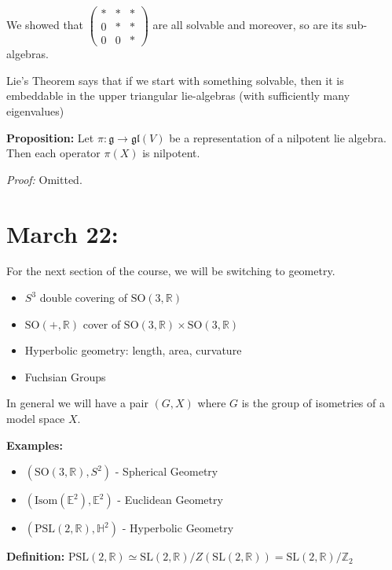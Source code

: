 \documentclass[12pt]{article}
\newcommand{\R}{\mathbb{R}}
\newcommand{\E}{\mathbb{E}}
\newcommand{\Z}{\mathbb{Z}}
\renewcommand{\H}{\mathbb{H}}
\newcommand{\SL}{\text{SL}}
\newcommand{\SO}{\text{SO}}
\newcommand{\g}{\mathfrak{g}}
\newcommand{\gl}{\mathfrak{gl}}
\newcommand{\Isom}{\text{Isom}}
\newcommand{\PSL}{\text{PSL}}
\newenvironment*{tbox}[2][gray]{
    \begin{tcolorbox}[
        parbox=false,
        colback=#1!5!white,
        colframe=#1!75!black,
        breakable,
        title={#2}
    ]}
    {\end{tcolorbox}}
\begin{document}
    We showed that $\begin{pmatrix}
        * & * & *\\ 
        0 & * & *\\ 
        0 & 0 & *
    \end{pmatrix}$ are all solvable and moreover, so are its sub-algebras. 

    Lie's Theorem says that if we start with something solvable, then it is embeddable in the upper triangular lie-algebras (with sufficiently many eigenvalues) 
    
    \textbf{Proposition:} Let $\pi: \g \to \gl(V)$ be a representation of a nilpotent lie algebra. Then each operator $\pi(X)$ is nilpotent. 

    \begin{tbox}{\textbf{Engel's Theorem:} Let $\pi: \g \to \gl(V)$ be a representation such that each $\pi(X)$ is nilpotent (vanishes under powers) for each $X \in \g$. Then $\pi(\g)$ is a nilpotent lie-algebra (lower central series converges).}
        \emph{Proof:} Omitted.
    \end{tbox}

\section{March 22:} 
    For the next section of the course, we will be switching to geometry. 
    \begin{itemize}
        \item $S^3$ double covering of $\SO(3, \R)$
        \item $\SO(+, \R)$ cover of $\SO(3, \R) \times \SO(3, \R)$
        \item Hyperbolic geometry: length, area, curvature 
        \item Fuchsian Groups 
    \end{itemize}

    In general we will have a pair $(G, X)$ where $G$ is the group of isometries of a model space $X$. 

    \textbf{Examples:}
    \begin{itemize}
        \item $(\SO(3, \R), S^2)$ - Spherical Geometry 
        \item $(\Isom(\E^2), \E^2)$ - Euclidean Geometry 
        \item $(\PSL(2, \R), \H^2)$ - Hyperbolic Geometry 
    \end{itemize}

    \textbf{Definition:} $\PSL(2, \R) \simeq \SL(2, \R)/Z(\SL(2, \R)) = \SL(2, \R)/\Z_2$ 
\end{document}
